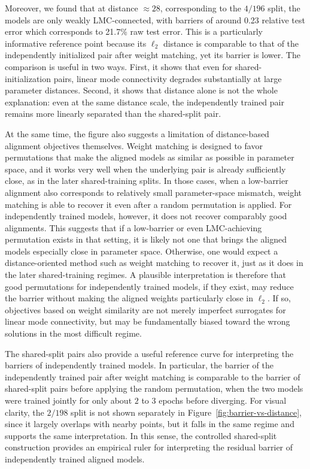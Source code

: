 \documentclass[11pt,a4paper]{report}
\begin{document}
Moreover, we found that at distance $\approx 28$, corresponding to the $4/196$ split, the models are only weakly LMC-connected, with barriers of around 0.23 relative test error which corresponds to 21.7\% raw test error. This is a particularly informative reference point because its $\ell_2$ distance is comparable to that of the independently initialized pair after weight matching, yet its barrier is lower. The comparison is useful in two ways. First, it shows that even for shared-initialization pairs, linear mode connectivity degrades substantially at large parameter distances. Second, it shows that distance alone is not the whole explanation: even at the same distance scale, the independently trained pair remains more linearly separated than the shared-split pair.

At the same time, the figure also suggests a limitation of distance-based alignment objectives themselves. Weight matching is designed to favor permutations that make the aligned models as similar as possible in parameter space, and it works very well when the underlying pair is already sufficiently close, as in the later shared-training splits. In those cases, when a low-barrier alignment also corresponds to relatively small parameter-space mismatch, weight matching is able to recover it even after a random permutation is applied. For independently trained models, however, it does not recover comparably good alignments. This suggests that if a low-barrier or even LMC-achieving permutation exists in that setting, it is likely not one that brings the aligned models especially close in parameter space. Otherwise, one would expect a distance-oriented method such as weight matching to recover it, just as it does in the later shared-training regimes. A plausible interpretation is therefore that good permutations for independently trained models, if they exist, may reduce the barrier without making the aligned weights particularly close in $\ell_2$. If so, objectives based on weight similarity are not merely imperfect surrogates for linear mode connectivity, but may be fundamentally biased toward the wrong solutions in the most difficult regime.

The shared-split pairs also provide a useful reference curve for interpreting the barriers of independently trained models. In particular, the barrier of the independently trained pair after weight matching is comparable to the barrier of shared-split pairs before applying the random permutation, when the two models were trained jointly for only about \(2\) to \(3\) epochs before diverging. For visual clarity, the \(2/198\) split is not shown separately in Figure~\ref{fig:barrier-vs-distance}, since it largely overlaps with nearby points, but it falls in the same regime and supports the same interpretation. In this sense, the controlled shared-split construction provides an empirical ruler for interpreting the residual barrier of independently trained aligned models.
\end{document}
